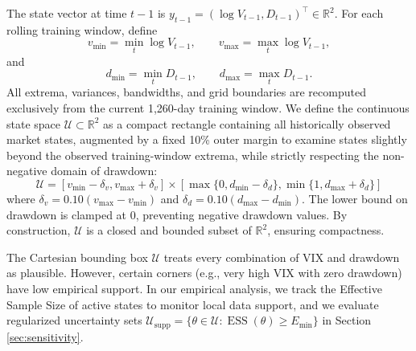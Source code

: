 \documentclass[smallcondensed]{svjour3}
\begin{document}
The state vector at time $t-1$ is $y_{t-1} = (\log V_{t-1}, D_{t-1})^\top \in \mathbb{R}^2$. For each rolling training window, define
\begin{equation}
v_{\min}=\min_t \log V_{t-1},\qquad v_{\max}=\max_t \log V_{t-1},
\end{equation}
and
\begin{equation}
d_{\min}=\min_t D_{t-1},\qquad d_{\max}=\max_t D_{t-1}.
\end{equation}
All extrema, variances, bandwidths, and grid boundaries are recomputed exclusively from the current 1,260-day training window. We define the continuous state space $\mathcal{U} \subset \mathbb{R}^2$ as a compact rectangle containing all historically observed market states, augmented by a fixed 10\% outer margin to examine states slightly beyond the observed training-window extrema, while strictly respecting the non-negative domain of drawdown:
\begin{equation}
    \mathcal{U} = [v_{\min} - \delta_v, v_{\max} + \delta_v] \times [\max\{0, d_{\min} - \delta_d\}, \min\{1, d_{\max} + \delta_d\}]
\end{equation}
where $\delta_v = 0.10 (v_{\max} - v_{\min})$ and $\delta_d = 0.10 (d_{\max} - d_{\min})$. The lower bound on drawdown is clamped at 0, preventing negative drawdown values. By construction, $\mathcal{U}$ is a closed and bounded subset of $\mathbb{R}^2$, ensuring compactness.

\begin{remark}
The Cartesian bounding box $\mathcal{U}$ treats every combination of VIX and drawdown as plausible. However, certain corners (e.g., very high VIX with zero drawdown) have low empirical support. In our empirical analysis, we track the Effective Sample Size of active states to monitor local data support, and we evaluate regularized uncertainty sets $\mathcal{U}_{\text{supp}} = \{\theta \in \mathcal{U} : \operatorname{ESS}(\theta) \ge E_{\min}\}$ in Section \ref{sec:sensitivity}.
\end{remark}
\end{document}

